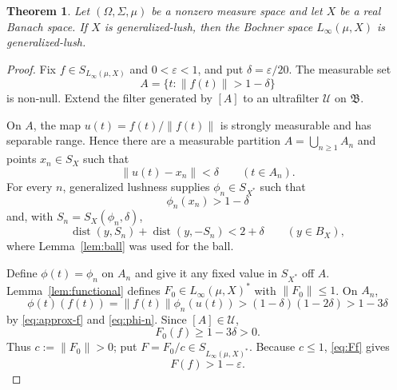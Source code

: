 \documentclass[11pt,a4paper]{article}
\newtheorem{theorem}{Theorem}
\newcommand{\dist}{\operatorname{dist}}
\begin{document}
\begin{theorem}\label{thm:main}
Let $(\Omega,\Sigma,\mu)$ be a nonzero measure space and let $X$ be a real
Banach space.  If $X$ is generalized-lush, then the Bochner space
$L_\infty(\mu,X)$ is generalized-lush.
\end{theorem}

\begin{proof}
Fix $f\in S_{L_\infty(\mu,X)}$ and $0<\varepsilon<1$, and put
$\delta=\varepsilon/20$.  The measurable set
\[
 A=\{t:\|f(t)\|>1-\delta\}
\]
is non-null.  Extend the filter generated by $[A]$ to an ultrafilter
$\mathcal U$ on $\mathfrak B$.

On $A$, the map $u(t)=f(t)/\|f(t)\|$ is strongly measurable and has
separable range.  Hence there are a measurable partition
$A=\bigcup_{n\ge1}A_n$ and points $x_n\in S_X$ such that
\begin{equation}\label{eq:approx-f}
 \|u(t)-x_n\|<\delta\qquad(t\in A_n).
\end{equation}
For every $n$, generalized lushness supplies
$\phi_n\in S_{X^*}$ such that
\begin{equation}\label{eq:phi-n}
 \phi_n(x_n)>1-\delta
\end{equation}
and, with $S_n=S_X(\phi_n,\delta)$,
\begin{equation}\label{eq:GL-n}
 \dist(y,S_n)+\dist(y,-S_n)<2+\delta
 \qquad(y\in B_X),
\end{equation}
where Lemma~\ref{lem:ball} was used for the ball.

Define $\phi(t)=\phi_n$ on $A_n$ and give it any fixed value in $S_{X^*}$
off $A$.  Lemma~\ref{lem:functional} defines $F_0\in
L_\infty(\mu,X)^*$ with $\|F_0\|\le1$.  On $A_n$,
\[
 \phi(t)(f(t))
 =\|f(t)\|\phi_n(u(t))
 >(1-\delta)(1-2\delta)>1-3\delta
\]
by \eqref{eq:approx-f} and \eqref{eq:phi-n}.  Since $[A]\in\mathcal U$,
\begin{equation}\label{eq:Ff}
 F_0(f)\ge1-3\delta>0.
\end{equation}
Thus $c:=\|F_0\|>0$; put $F=F_0/c\in S_{L_\infty(\mu,X)^*}$.
Because $c\le1$, \eqref{eq:Ff} gives
\[
 F(f)>1-\varepsilon.
\]


\end{proof}
\end{document}
